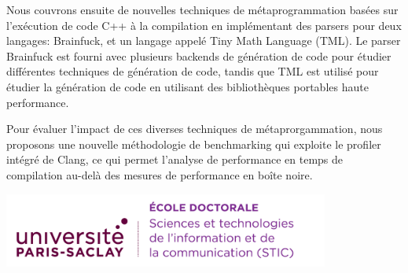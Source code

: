\documentclass[english,12pt,a4paper]{book}
\begin{document}
\begin{mdframed}[linecolor=Prune,linewidth=1]
\begin{multicols}{2}
Nous couvrons ensuite de nouvelles techniques de m\'etaprogrammation bas\'ees
sur l'ex\'ecution de code C++ \`a la compilation en impl\'ementant des parsers
pour deux langages: Brainfuck, et un langage appel\'e Tiny Math Language (TML).
Le parser Brainfuck est fourni avec plusieurs backends de g\'en\'eration de code
pour \'etudier diff\'erentes techniques de g\'en\'eration de code, tandis que
TML est utilis\'e pour \'etudier la g\'en\'eration de code en utilisant des
biblioth\`eques portables haute performance.

Pour \'evaluer l'impact de ces diverses techniques de m\'etaprorgammation,
nous proposons une nouvelle m\'ethodologie de benchmarking qui exploite
le profiler int\'egr\'e de Clang, ce qui permet l'analyse de performance
en temps de compilation au-del\`a des mesures de performance en bo\^ite noire.

\end{multicols}

\end{mdframed}

\clearpage

\thispagestyle{empty}

\noindent
\includegraphics[height=2.45cm]{ups/logo_STIC.png}
\vspace{1cm}
\end{document}
